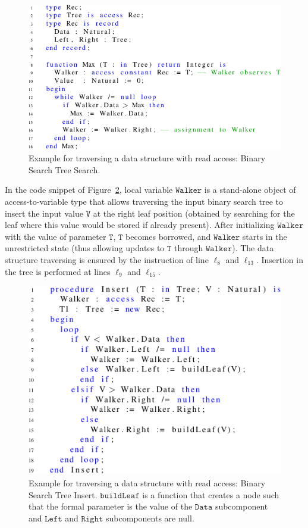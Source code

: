 \documentclass{llncs}
\newcommand\var[1]{\ensuremath{\mathtt{#1}}}
\begin{document}
\begin{figure}[htb!]
\centering
  \captionsetup{justification=centering,margin=0.6cm}
   \includegraphics[]{maxTree}
   \caption{Example for traversing a data structure with read access: Binary Search Tree Search.}
   \label{fig:maxTree}
\end{figure}


In the code snippet of Figure~\ref{fig:treeInsert}, local variable \var{Walker} is a stand-alone object of access-to-variable type that allows traversing the input binary
search tree to insert the input value \var{V} at the right leaf position (obtained by searching for the leaf where this value would be stored if already present).
After initializing \var{Walker} with the value of parameter \var{T}, \var{T} becomes borrowed, and \var{Walker} starts in the unrestricted state (thus allowing updates to \var{T} through \var{Walker}).
The data structure traversing is ensured by the instruction of line $\ell_8$ and $\ell_{13}$. Insertion in the tree is performed at lines
$\ell_9$ and $\ell_{15}$.


\begin{figure}[htb!]
\centering
  \captionsetup{justification=centering,margin=0.6cm}
   \includegraphics[]{treeInsert}
   \caption{Example for traversing a data structure with read access: Binary Search Tree Insert. \var{buildLeaf} is a function that creates a node such that the formal
	parameter is the value of the \var{Data} subcomponent and \var{Left} and \var{Right} subcomponents are null.}
   \label{fig:treeInsert}
\end{figure}
\end{document}
